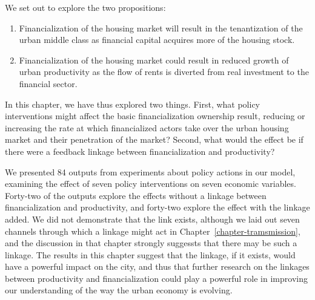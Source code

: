 We set out to explore the two propositions:
\begin{enumerate} 
\item Financialization of the housing market will result in the tenantization of the urban middle class as financial capital acquires more of the housing stock. %
\item Financialization of the housing market could result in reduced growth of urban productivity as the flow of rents is diverted from real investment to the financial sector.
\end{enumerate} 
In this chapter, we have thus explored two things. First, what policy interventions might affect the basic financialization ownership result, reducing or increasing the rate at which financialized actors take over the urban housing market and their penetration of the market? Second, what would the effect be if there were a feedback linkage between financialization and productivity? 


We presented 84 outputs from experiments about policy actions in our model, examining the effect of seven policy interventions on seven economic variables. Forty-two of the outputs explore the effects without a linkage between financialization and productivity, and forty-two explore the effect with the linkage added. %
We did not demonstrate that the link exists, although we laid out seven channels through which a linkage might act in Chapter~\ref{chapter-tramsmission}, and the discussion in that chapter strongly suggessts that there may be such a linkage. %
The results in this chapter suggest that the linkage, if it exists, would have a powerful impact on the city, and thus that further research on the linkages between productivity and financialization could play a powerful role in improving our understanding of the way the urban economy is evolving. %

